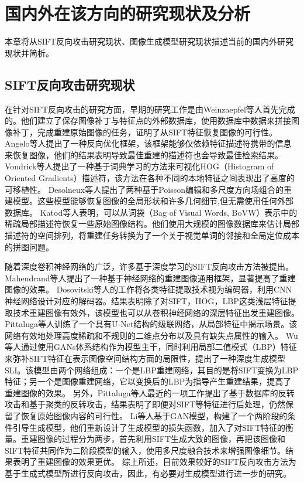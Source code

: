 \section{国内外在该方向的研究现状及分析}
本章将从SIFT反向攻击研究现状、图像生成模型研究现状描述当前的国内外研究现状并简析。
\subsection{SIFT反向攻击研究现状}
在针对SIFT反向攻击的研究方面，早期的研究工作是由Weinzaepfel\cite{5995616}等人首先完成的。他们建立了保存图像补丁与特征点的外部数据库，使用数据库中数据来拼接图像补丁，完成重建原始图像的任务，证明了从SIFT特征恢复图像的可行性。
Angelo\cite{6460288}等人提出了一种反向优化框架，该框架能够仅依赖特征描述符携带的信息来恢复图像，他们的结果表明导致最佳重建的描述符也会导致最佳检索结果。
Vondrick\cite{Vondrick_2013_ICCV}等人提出了一种基于词典学习的方法来可视化HOG（Histogram of Oriented Gradients）描述符，该方法在各种不同的本地特征之间表现出了高度的可移植性。
Desolneux\cite{10.1007/978-3-319-58771-4_11}等人提出了两种基于Poisson编辑和多尺度方向场组合的重建模型。这些模型能够恢复图像的全局形状和许多几何细节,但无需使用任何外部数据库。
Katod\cite{Kato_2014_CVPR}等人表明，可以从词袋（Bag of Visual Words, BoVW）表示中的稀疏局部描述符恢复一些原始图像结构。他们使用大规模的图像数据库来估计局部描述符的空间排列，将重建任务转换为了一个关于视觉单词的邻接和全局定位成本的拼图问题。
\par
随着深度卷积神经网络的广泛，许多基于深度学习的SIFT反向攻击方法被提出。
Mahendrand\cite{Mahendran_2015_CVPR}等人提出了一种基于神经网络的重建图像通用框架，显著提高了重建图像的效果。
Dosovitski\cite{Dosovitskiy_2016_CVPR}等人的工作将各类特征提取技术视为编码器，利用CNN神经网络设计对应的解码器。结果表明除了对SIFT，HOG，LBP这类浅层特征提取技术重建图像有效外，该模型也可以从卷积神经网络的深层特征出发重建图像。
Pittaluga\cite{Pittaluga_2019_CVPR}等人训练了一个具有U-Net结构的级联网络，从局部特征中揭示场景。该网络有效地处理高度稀疏和不规则的二维点分布以及具有缺失点属性的输入。
Wu\cite{9393327}等人通过使用GANs体系结构作为模型主干，同时利用局部二值模式（LBP）特征来弥补SIFT特征在表示图像空间结构方面的局限性，提出了一种深度生成模型SLI。该模型由两个网络组成：一个是LBP重建网络，其目的是将SIFT变换为LBP特征；另一个是图像重建网络，它以变换后的LBP为指导产生重建结果，提高了重建图像的效果。
另外，Pittaluga\cite{Pittaluga_2023_ICCV}等人最近的一项工作提出了基于数据库的反转攻击和基于聚类的反转攻击，结果表明了即便对SIFT等特征进行后处理，仍然保留了恢复原始图像内容的可行性。
Li\cite{liDeepReverseAttack2024}等人基于GAN模型，构建了一个两阶段的条件引导生成模型，他们重新设计了生成模型的损失函数，加入了对SIFT特征的衡量。重建图像的过程分为两步，首先利用SIFT生成大致的图像，再把该图像和SIFT特征共同作为二阶段模型的输入，使用多尺度融合技术来增强图像细节。结果表明了重建图像的效果更优。
综上所述，目前效果较好的SIFT反向攻击方法为基于生成式模型所进行反向攻击，因此，有必要对生成模型进行进一步的研究。
